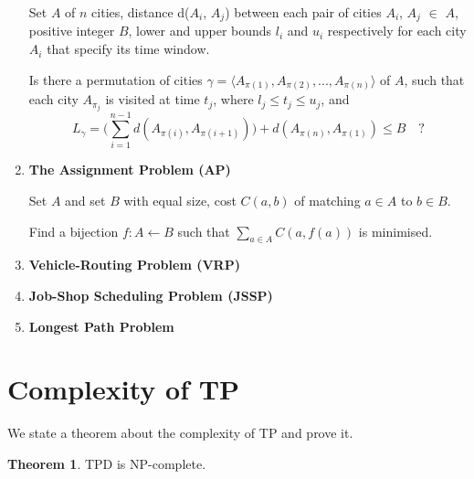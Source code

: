 \documentclass{mprop}
\theoremstyle{definition}
\newtheorem{theorem}{Theorem}
\begin{document}
\begin{enumerate}
\begin{instance}
Set $A$ of $n$ cities, distance d($A_{i}$, $A_{j}$) between each pair of cities $A_{i}$, $A_{j}$ $\in$ $A$, positive integer $B$, lower and upper bounds $l_{i}$ and $u_{i}$ respectively for each city $A_{i}$ that specify its time window.
\end{instance}

\begin{question}
\color{red}
Is there a permutation of cities $\gamma = \langle A_{\pi(1)}, A_{\pi(2)},...,A_{\pi(n)} \rangle$ of $A$, such that each city $A_{\pi_{j}}$ is visited at time $t_{j}$, where $l_{j} \leq t_{j} \leq u_{j}$, and 
$$L_{\gamma} = \bigg( \sum_{i=1}^{n-1} d(A_{\pi(i)}, A_{\pi(i+1)}) \bigg) + d(A_{\pi(n)}, A_{\pi(1)}) \leq B \quad \textrm{?}$$

\end{question}

\item \textbf{The Assignment Problem (AP)}

\begin{instance}
Set $A$ and set $B$ with equal size, cost $C(a,b)$ of matching $a \in A$ to $b \in B$.
\end{instance}

\begin{question}
Find a bijection $f: A \gets B$ such that $\sum_{a\in A} C(a,f(a))$ is minimised.
\end{question}
\item \textbf{Vehicle-Routing Problem (VRP)}
\item \textbf{Job-Shop Scheduling Problem (JSSP)}
\item \textbf{Longest Path Problem}
\end{enumerate}

\section{Complexity of TP}
We state a theorem about the complexity of TP and prove it.
\begin{theorem}
TPD is NP-complete.
\end{theorem}
\end{document}
